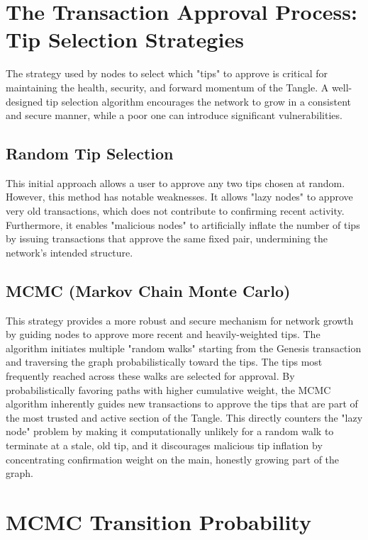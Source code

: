 \documentclass{scrbook}
\begin{document}
\section{The Transaction Approval Process: Tip Selection Strategies}

The strategy used by nodes to select which "tips" to approve is critical for maintaining the health, security, and forward momentum of the Tangle. A well-designed tip selection algorithm encourages the network to grow in a consistent and secure manner, while a poor one can introduce significant vulnerabilities.

\subsection{Random Tip Selection}

This initial approach allows a user to approve any two tips chosen at random. However, this method has notable weaknesses. It allows "lazy nodes" to approve very old transactions, which does not contribute to confirming recent activity. Furthermore, it enables "malicious nodes" to artificially inflate the number of tips by issuing transactions that approve the same fixed pair, undermining the network's intended structure.

\subsection{MCMC (Markov Chain Monte Carlo)}

This strategy provides a more robust and secure mechanism for network growth by guiding nodes to approve more recent and heavily-weighted tips. The algorithm initiates multiple "random walks" starting from the Genesis transaction and traversing the graph probabilistically toward the tips. The tips most frequently reached across these walks are selected for approval. By probabilistically favoring paths with higher cumulative weight, the MCMC algorithm inherently guides new transactions to approve the tips that are part of the most trusted and active section of the Tangle. This directly counters the "lazy node" problem by making it computationally unlikely for a random walk to terminate at a stale, old tip, and it discourages malicious tip inflation by concentrating confirmation weight on the main, honestly growing part of the graph.

\section{MCMC Transition Probability}
\end{document}
